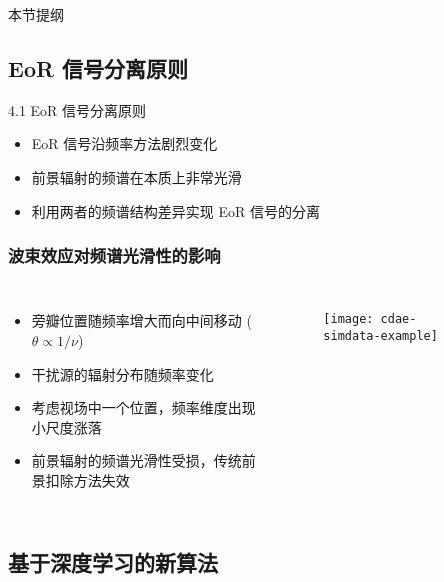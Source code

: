 \documentclass{beamer}
\begin{document}
\begin{frame}
  \begin{block}{本节提纲}
    \vspace{2ex}
    \tableofcontents[
      sections=\value{section},
      sectionstyle=hide,
    ]
  \end{block}
\end{frame}

\subsection{EoR 信号分离原则}

\begin{frame}{4.1 EoR 信号分离原则}
  \begin{itemize}
    \item EoR 信号沿频率方法剧烈变化
    \item 前景辐射的频谱在本质上非常光滑
    \item 利用两者的频谱结构差异实现 EoR 信号的分离
  \end{itemize}
\end{frame}

\begin{frame}[subsec]
  \frametitle{波束效应对频谱光滑性的影响}
  \begin{columns}[t,onlytextwidth]
    \begin{itemize}
      \item 旁瓣位置随频率增大而向中间移动 ($\theta \propto 1/\nu$)
      \item 干扰源的辐射分布随频率变化
      \item 考虑视场中一个位置，频率维度出现小尺度涨落
      \item 前景辐射的频谱光滑性受损，传统前景扣除方法失效
    \end{itemize}

    \begin{figure}
      \centering
      \texttt{[image: cdae-simdata-example]}
    \end{figure}
  \end{columns}
\end{frame}

\subsection{基于深度学习的新算法}
\end{document}
